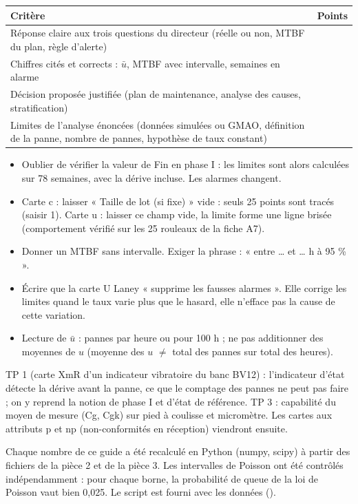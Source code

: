 \documentclass[10pt,a4paper]{article}
\begin{document}
\begin{tabularx}{\linewidth}{|X|>{\centering\arraybackslash}p{14mm}|}
\hline
\rowcolor{fond}\textbf{Critère} & \textbf{Points}\\\hline
Réponse claire aux trois questions du directeur (réelle ou non, MTBF du plan, règle d'alerte) & 3\\\hline
Chiffres cités et corrects : $\bar u$, MTBF avec intervalle, semaines en alarme & 3\\\hline
Décision proposée justifiée (plan de maintenance, analyse des causes, stratification) & 2\\\hline
Limites de l'analyse énoncées (données simulées ou GMAO, définition de la panne, nombre de pannes, hypothèse de taux constant) & 2\\\hline
\end{tabularx}

\begin{itemize}
\item Oublier de vérifier la valeur de Fin en phase I : les limites sont alors calculées sur 78 semaines, avec la dérive incluse. Les alarmes changent.
\item Carte c : laisser « Taille de lot (si fixe) » vide : seuls 25 points sont tracés (saisir 1). Carte u : laisser ce champ vide, la limite forme une ligne brisée (comportement vérifié sur les 25 rouleaux de la fiche A7).
\item Donner un MTBF sans intervalle. Exiger la phrase : « entre \dots{} et \dots{} h à 95 \% ».
\item Écrire que la carte U Laney « supprime les fausses alarmes ». Elle corrige les limites quand le taux varie plus que le hasard, elle n'efface pas la cause de cette variation.
\item Lecture de $\bar u$ : pannes par heure ou pour 100 h ; ne pas additionner des moyennes de $u$ (moyenne des $u$ $\neq$ total des pannes sur total des heures).
\end{itemize}

TP 1 (carte XmR d'un indicateur vibratoire du banc BV12) : l'indicateur d'état détecte la dérive avant la panne, ce que le comptage des pannes ne peut pas faire ; on y reprend la notion de phase I et d'état de référence. TP 3 : capabilité du moyen de mesure (Cg, Cgk) sur pied à coulisse et micromètre. Les cartes aux attributs p et np (non-conformités en réception) viendront ensuite.

Chaque nombre de ce guide a été recalculé en Python (numpy, scipy) à partir des fichiers de la pièce 2 et de la pièce 3. Les intervalles de Poisson ont été contrôlés indépendamment : pour chaque borne, la probabilité de queue de la loi de Poisson vaut bien 0,025. Le script est fourni avec les données ().
\end{document}
